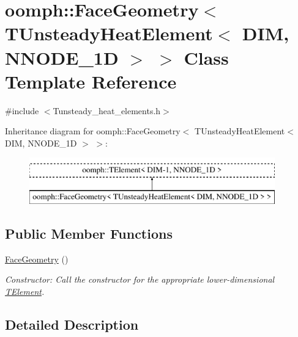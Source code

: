 \hypertarget{classoomph_1_1FaceGeometry_3_01TUnsteadyHeatElement_3_01DIM_00_01NNODE__1D_01_4_01_4}{}\section{oomph\+:\+:Face\+Geometry$<$ T\+Unsteady\+Heat\+Element$<$ D\+IM, N\+N\+O\+D\+E\+\_\+1D $>$ $>$ Class Template Reference}
\label{classoomph_1_1FaceGeometry_3_01TUnsteadyHeatElement_3_01DIM_00_01NNODE__1D_01_4_01_4}


{\ttfamily \#include $<$Tunsteady\+\_\+heat\+\_\+elements.\+h$>$}

Inheritance diagram for oomph\+:\+:Face\+Geometry$<$ T\+Unsteady\+Heat\+Element$<$ D\+IM, N\+N\+O\+D\+E\+\_\+1D $>$ $>$\+:\begin{figure}[H]
\begin{center}
\leavevmode
\includegraphics[height=2.000000cm]{classoomph_1_1FaceGeometry_3_01TUnsteadyHeatElement_3_01DIM_00_01NNODE__1D_01_4_01_4}
\end{center}
\end{figure}
\subsection*{Public Member Functions}
\begin{DoxyCompactItemize}
\item 
\hyperlink{classoomph_1_1FaceGeometry_3_01TUnsteadyHeatElement_3_01DIM_00_01NNODE__1D_01_4_01_4_aaa769e2b78896380662b06975efd752e}{Face\+Geometry} ()
\begin{DoxyCompactList}\small\item\em Constructor\+: Call the constructor for the appropriate lower-\/dimensional \hyperlink{classoomph_1_1TElement}{T\+Element}. \end{DoxyCompactList}\end{DoxyCompactItemize}


\subsection{Detailed Description}
